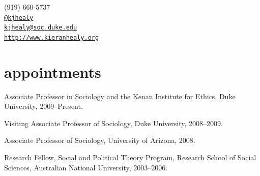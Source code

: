 \documentclass[11pt,oneside,a4paper,DIV=8]{scrartcl}
\makeatletter
\def\myemail{kjhealy@soc.duke.edu}
\def\myweb{http://www.kieranhealy.org}
\def\myphone{(919) 660-5737}
\def\mytwitter{@kjhealy}
\makeatother
\begin{document}


\begin{minipage}[t]{2.95in}
  
\end{minipage}
\hfill     
\hfill
\begin{minipage}[t]{1.3in}
  \flushright \footnotesize  \addressblock \myphone \, \faPhone \\ 
  {\scriptsize  \texttt{\href{http://twitter.com/kjhealy}{\mytwitter}} \, \faTwitter }  \\ 
  {\scriptsize  \texttt{\href{mailto:\myemail}{\myemail}} \, \faEnvelope} \\
  {\scriptsize  \texttt{\href{\myweb}{\myweb}} \, \faGlobe}
\end{minipage}



\reversemarginpar

       


% 
\section{appointments}

Associate Professor in Sociology and the Kenan Institute for Ethics, Duke University, 2009--Present.      

Visiting Associate Professor of Sociology, Duke University, 2008--2009.

Associate Professor of Sociology, University of Arizona, 2008.

Research Fellow, Social and Political Theory Program,
Research School of Social Sciences, Australian National University, 2003--2006.
\end{document}
